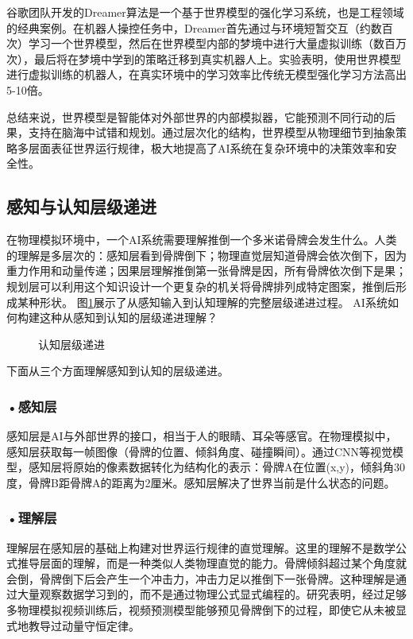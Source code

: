 谷歌团队开发的Dreamer算法是一个基于世界模型的强化学习系统，也是工程领域的经典案例。在机器人操控任务中，Dreamer首先通过与环境短暂交互（约数百次）学习一个世界模型，然后在世界模型内部的梦境中进行大量虚拟训练（数百万次），最后将在梦境中学到的策略迁移到真实机器人上。实验表明，使用世界模型进行虚拟训练的机器人，在真实环境中的学习效率比传统无模型强化学习方法高出5-10倍。

总结来说，世界模型是智能体对外部世界的内部模拟器，它能预测不同行动的后果，支持在脑海中试错和规划。通过层次化的结构，世界模型从物理细节到抽象策略多层面表征世界运行规律，极大地提高了AI系统在复杂环境中的决策效率和安全性。



\subsection{感知与认知层级递进}
在物理模拟环境中，一个AI系统需要理解推倒一个多米诺骨牌会发生什么。人类的理解是多层次的：感知层看到骨牌倒下；物理直觉层知道骨牌会依次倒下，因为重力作用和动量传递；因果层理解推倒第一张骨牌是因，所有骨牌依次倒下是果；规划层可以利用这个知识设计一个更复杂的机关将骨牌排列成特定图案，推倒后形成某种形状。
图\ref{fig:ch2_2_35}展示了从感知输入到认知理解的完整层级递进过程。
AI系统如何构建这种从感知到认知的层级递进理解？
\begin{figure}[H]
\centering
{}
\caption{认知层级递进}
\label{fig:ch2_2_35}
\end{figure}
下面从三个方面理解感知到认知的层级递进。

\subsubsection*{\textbf{•感知层}}

感知层是AI与外部世界的接口，相当于人的眼睛、耳朵等感官。在物理模拟中，感知层获取每一帧图像（骨牌的位置、倾斜角度、碰撞瞬间）。通过CNN等视觉模型，感知层将原始的像素数据转化为结构化的表示：骨牌A在位置(x,y)，倾斜角30度，骨牌B距骨牌A的距离为2厘米。感知层解决了世界当前是什么状态的问题。



\subsubsection*{\textbf{•理解层}}

理解层在感知层的基础上构建对世界运行规律的直觉理解。这里的理解不是数学公式推导层面的理解，而是一种类似人类物理直觉的能力。骨牌倾斜超过某个角度就会倒，骨牌倒下后会产生一个冲击力，冲击力足以推倒下一张骨牌。这种理解是通过大量观察数据学习到的，而不是通过物理公式显式编程的。研究表明，经过足够多物理模拟视频训练后，视频预测模型能够预见骨牌倒下的过程，即使它从未被显式地教导过动量守恒定律。

